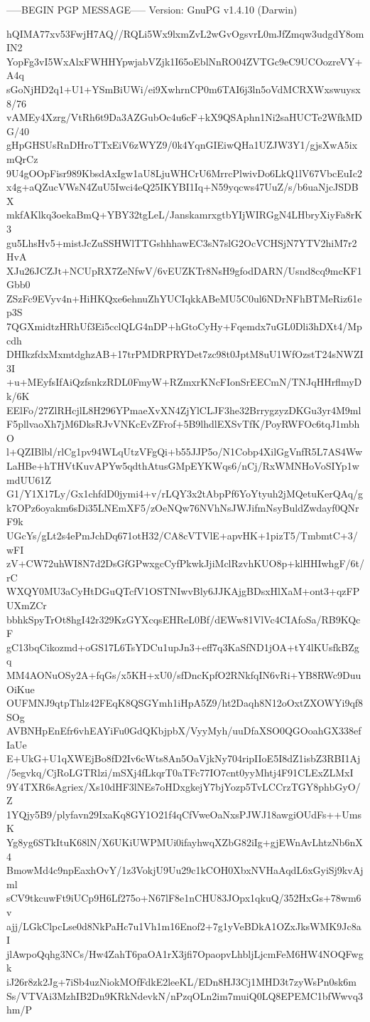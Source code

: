 -----BEGIN PGP MESSAGE-----
Version: GnuPG v1.4.10 (Darwin)

hQIMA77xv53FwjH7AQ//RQLi5Wx9lxmZvL2wGvOgsvrL0mJfZmqw3udgdY8omIN2
YopFg3vI5WxAlxFWHHYpwjabVZjk1I65oEblNnRO04ZVTGc9eC9UCOozreVY+A4q
sGoNjHD2q1+U1+YSmBiUWi/ei9XwhrnCP0m6TAI6j3ln5oVdMCRXWxswuysx8/76
vAMEy4Xzrg/VtRh6t9Da3AZGubOc4u6cF+kX9QSAphn1Ni2saHUCTe2WfkMDG/40
gHpGHSUsRnDHroTTxEiV6zWYZ9/0k4YqnGIEiwQHa1UZJW3Y1/gjsXwA5ixmQrCz
9U4gOOpFisr989KbsdAxIgw1aU8LjuWHCrU6MrrcPlwivDo6LkQ1lV67VbcEuIc2
x4g+aQZucVWsN4ZuU5Iwci4eQ25IKYBI1Iq+N59yqcws47UuZ/s/b6uaNjcJSDBX
mkfAKlkq3oekaBmQ+YBY32tgLeL/JanskamrxgtbYIjWIRGgN4LHbryXiyFa8rK3
gu5LhsHv5+mistJcZuSSHWlTTGshhhawEC3sN7slG2OcVCHSjN7YTV2hiM7r2HvA
XJu26JCZJt+NCUpRX7ZeNfwV/6vEUZKTr8NsH9gfodDARN/Usnd8cq9mcKF1Gbb0
ZSzFc9EVyv4n+HiHKQxe6ehnuZhYUCIqkkABeMU5C0ul6NDrNFhBTMeRiz61ep3S
7QGXmidtzHRhUf3Ei5cclQLG4nDP+hGtoCyHy+Fqemdx7uGL0Dli3hDXt4/Mpcdh
DHIkzfdxMxmtdghzAB+17trPMDRPRYDet7zc98t0JptM8uU1WfOzstT24sNWZI3I
+u+MEyfsIfAiQzfsnkzRDL0FmyW+RZmxrKNcFIonSrEECmN/TNJqHHrflmyDk/6K
EElFo/27ZlRHcjlL8H296YPmaeXvXN4ZjYlCLJF3he32BrrygzyzDKGu3yr4M9ml
F5pllvaoXh7jM6DksRJvVNKcEvZFrof+5B9lhdlEXSvTfK/PoyRWFOc6tqJ1mbhO
l+QZIBlbl/rlCg1pv94WLqUtzVFgQi+b55JJP5o/N1Cobp4XilGgVnfR5L7AS4Ww
LaHBe+hTHVtKuvAPYw5qdthAtusGMpEYKWqs6/nCj/RxWMNHoVoSIYp1wmdUU61Z
G1/Y1X17Ly/Gx1chfdD0jymi4+v/rLQY3x2tAbpPf6YoYtyuh2jMQetuKerQAq/g
k7OPz6oyakm6sDi35LNEmXF5/zOeNQw76NVhNsJWJifmNsyBuldZwdayf0QNrF9k
UGcYs/gLt2s4ePmJchDq671otH32/CA8cVTVlE+apvHK+1pizT5/TmbmtC+3/wFI
zV+CW72uhWI8N7d2DsGfGPwxgcCyfPkwkJjiMclRzvhKUO8p+klHHIwhgF/6t/rC
WXQY0MU3aCyHtDGuQTcfV1OSTNIwvBly6JJKAjgBDsxHlXaM+ont3+qzFPUXmZCr
bbhkSpyTrOt8hgI42r329KzGYXcqsEHReL0Bf/dEWw81VlVc4CIAfoSa/RB9KQcF
gC13bqCikozmd+oGS17L6TsYDCu1upJn3+eff7q3KaSfND1jOA+tY4lKUsfkBZgq
MM4AONuOSy2A+fqGs/x5KH+xU0/sfDncKpfO2RNkfqIN6vRi+YB8RWc9DuuOiKue
OUFMNJ9qtpThlz42FEqK8QSGYmh1iHpA5Z9/ht2Daqh8N12oOxtZXOWYi9qf8SOg
AVBNHpEnEfr6vhEAYiFu0GdQKbjpbX/VyyMyh/uuDfaXSO0QGOoahGX338efIaUe
E+UkG+U1qXWEjBo8fD2Iv6cWts8An5OaVjkNy704ripIIoE5I8dZ1isbZ3RBI1Aj
/5egvkq/CjRoLGTRlzi/mSXj4fLkqrT0aTFc77IO7cnt0yyMhtj4F91CLExZLMxI
9Y4TXR6sAgriex/Xs10dHF3lNEs7oHDxgkejY7bjYozp5TvLCCrzTGY8phbGyO/Z
1YQjy5B9/plyfavn29IxaKq8GY1O21f4qCfVweOaNxsPJWJ18awgiOUdFs++UmsK
Yg8yg6STkItuK68lN/X6UKiUWPMUi0ifayhwqXZbG82iIg+gjEWnAvLhtzNb6nX4
BmowMd4c9npEaxhOvY/1z3VokjU9Uu29c1kCOH0XbxNVHaAqdL6xGyiSj9kvAjml
sCV9tkcuwFt9iUCp9H6Lf275o+N67lF8e1nCHU83JOpx1qkuQ/352HxGs+78wm6v
ajj/LGkClpcLse0d8NkPaHc7u1Vh1m16Enof2+7g1yVeBDkA1OZxJksWMK9Jc8aI
jlAwpoQqhg3NCs/Hw4ZahT6paOA1rX3jfi7OpaopvLhbljLjcmFeM6HW4NOQFwgk
iJ26r8zk2Jg+7iSb4uzNiokMOfFdkE2leeKL/EDn8HJ3Cj1MHD3t7zyWsPn0sk6m
Ss/VTVAi3MzhIB2Dn9KRkNdevkN/nPzqOLn2im7muiQ0LQ8EPEMC1bfWwvq3hm/P
